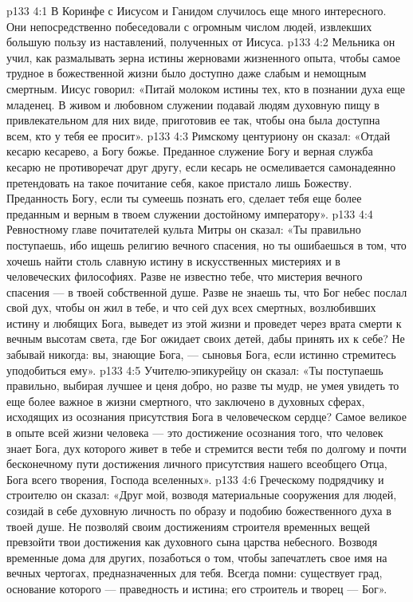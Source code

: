 \vs p133 4:1 В Коринфе с Иисусом и Ганидом случилось еще много интересного. Они непосредственно побеседовали с огромным числом людей, извлекших большую пользу из наставлений, полученных от Иисуса.
\vs p133 4:2 \pc Мельника он учил, как размалывать зерна истины жерновами жизненного опыта, чтобы самое трудное в божественной жизни было доступно даже слабым и немощным смертным. Иисус говорил: «Питай молоком истины тех, кто в познании духа еще младенец. В живом и любовном служении подавай людям духовную пищу в привлекательном для них виде, приготовив ее так, чтобы она была доступна всем, кто у тебя ее просит».
\vs p133 4:3 \pc Римскому центуриону он сказал: «Отдай кесарю кесарево, а Богу божье. Преданное служение Богу и верная служба кесарю не противоречат друг другу, если кесарь не осмеливается самонадеянно претендовать на такое почитание себя, какое пристало лишь Божеству. Преданность Богу, если ты сумеешь познать его, сделает тебя еще более преданным и верным в твоем служении достойному императору».
\vs p133 4:4 \pc Ревностному главе почитателей культа Митры он сказал: «Ты правильно поступаешь, ибо ищешь религию вечного спасения, но ты ошибаешься в том, что хочешь найти столь славную истину в искусственных мистериях и в человеческих философиях. Разве не известно тебе, что мистерия вечного спасения --- в твоей собственной душе. Разве не знаешь ты, что Бог небес послал свой дух, чтобы он жил в тебе, и что сей дух всех смертных, возлюбивших истину и любящих Бога, выведет из этой жизни и проведет через врата смерти к вечным высотам света, где Бог ожидает своих детей, дабы принять их к себе? Не забывай никогда: вы, знающие Бога, --- сыновья Бога, если истинно стремитесь уподобиться ему».
\vs p133 4:5 \pc Учителю\hyp{}эпикурейцу он сказал: «Ты поступаешь правильно, выбирая лучшее и ценя добро, но разве ты мудр, не умея увидеть то еще более важное в жизни смертного, что заключено в духовных сферах, исходящих из осознания присутствия Бога в человеческом сердце? Самое великое в опыте всей жизни человека --- это достижение осознания того, что человек знает Бога, дух которого живет в тебе и стремится вести тебя по долгому и почти бесконечному пути достижения личного присутствия нашего всеобщего Отца, Бога всего творения, Господа вселенных».
\vs p133 4:6 \pc Греческому подрядчику и строителю он сказал: «Друг мой, возводя материальные сооружения для людей, созидай в себе духовную личность по образу и подобию божественного духа в твоей душе. Не позволяй своим достижениям строителя временных вещей превзойти твои достижения как духовного сына царства небесного. Возводя временные дома для других, позаботься о том, чтобы запечатлеть свое имя на вечных чертогах, предназначенных для тебя. Всегда помни: существует град, основание которого --- праведность и истина; его строитель и творец --- Бог».
